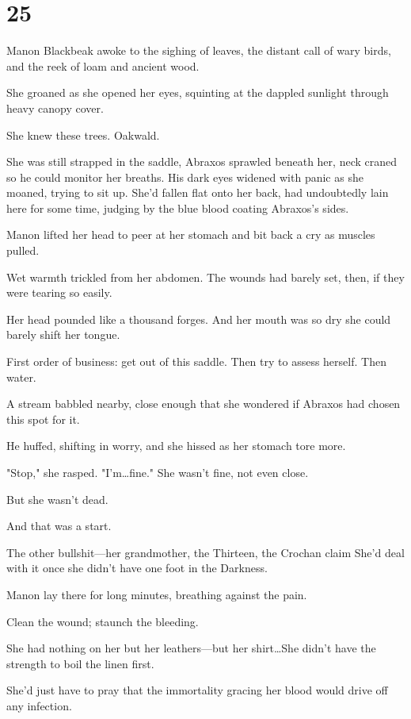 
\chapter{25}

Manon Blackbeak awoke to the sighing of leaves, the distant call of wary birds, and the reek of loam and ancient wood.

She groaned as she opened her eyes, squinting at the dappled sunlight through heavy canopy cover.

She knew these trees.
Oakwald.

She was still strapped in the saddle, Abraxos sprawled beneath her, neck craned so he could monitor her breaths.
His dark eyes widened with panic as she moaned, trying to sit up.
She'd fallen flat onto her back, had undoubtedly lain here for some time, judging by the blue blood coating Abraxos's sides.

Manon lifted her head to peer at her stomach and bit back a cry as muscles pulled.

Wet warmth trickled from her abdomen.
The wounds had barely set, then, if they were tearing so easily.

Her head pounded like a thousand forges.
And her mouth was so dry she could barely shift her tongue.

First order of business: get out of this saddle.
Then try to assess herself.
Then water.

A stream babbled nearby, close enough that she wondered if Abraxos had chosen this spot for it.

He huffed, shifting in worry, and she hissed as her stomach tore more.

"Stop," she rasped.
"I'm\ldots fine."
She wasn't fine, not even close.

But she wasn't dead.

And that was a start.

The other bullshit---her grandmother, the Thirteen, the Crochan claim  She'd deal with it once she didn't have one foot in the Darkness.

Manon lay there for long minutes, breathing against the pain.

Clean the wound; staunch the bleeding.

She had nothing on her but her leathers---but her shirt\ldots She didn't have the strength to boil the linen first.

She'd just have to pray that the immortality gracing her blood would drive off any infection.

